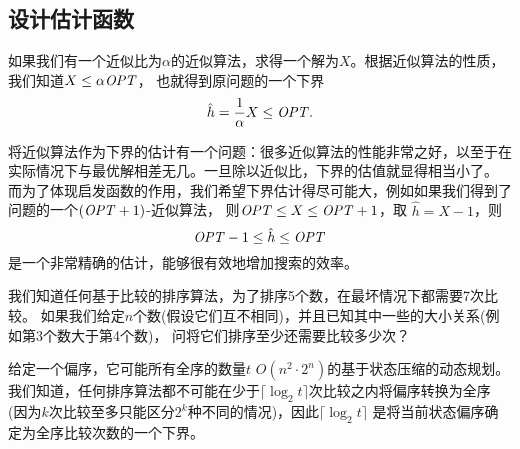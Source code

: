 \subsection{设计估计函数}

如果我们有一个近似比为$\alpha$的近似算法，求得一个解为$X$。根据近似算法的性质，我们知道$X \leq \alpha {\it OPT}$，
也就得到原问题的一个下界
$$\hat h = {1\over \alpha}X \leq {\it OPT}.$$

将近似算法作为下界的估计有一个问题：很多近似算法的性能非常之好，以至于在实际情况下与最优解相差无几。一旦除以近似比，下界的估值就显得相当小了。
而为了体现启发函数的作用，我们希望下界估计得尽可能大，例如如果我们得到了问题的一个$({\it OPT}+1)$-近似算法，
则${\it OPT}\le X\le {\it OPT}+1$，取
$\hat h=X-1$，则
$${\it OPT}-1 \le \hat h \le {\it OPT}$$
是一个非常精确的估计，能够很有效地增加搜索的效率。

\begin{prob}[比较排序]
 我们知道任何基于比较的排序算法，为了排序5个数，在最坏情况下都需要7次比较。
 如果我们给定$n$个数(假设它们互不相同)，并且已知其中一些的大小关系(例如第3个数大于第4个数)，
 问将它们排序至少还需要比较多少次？
\end{prob}

\begin{solution}

给定一个偏序，它可能所有全序的数量$t$
$O(n^2\cdot 2^n)$的基于状态压缩的动态规划。
我们知道，任何排序算法都不可能在少于$\lceil \log_2 t\rceil$次比较之内将偏序转换为全序
(因为$k$次比较至多只能区分$2^k$种不同的情况)，因此$\lceil \log_2 t\rceil$
是将当前状态偏序确定为全序比较次数的一个下界。

\end{solution}
